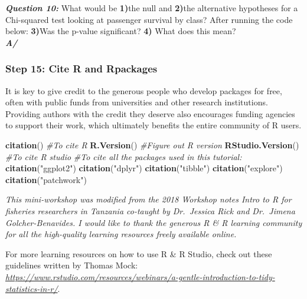 \documentclass[]{article}
\newenvironment{Shaded}{\begin{snugshade}}{\end{snugshade}}
\newcommand{\CommentTok}[1]{\textcolor[rgb]{0.56,0.35,0.01}{\textit{#1}}}
\newcommand{\KeywordTok}[1]{\textcolor[rgb]{0.13,0.29,0.53}{\textbf{#1}}}
\newcommand{\NormalTok}[1]{#1}
\newcommand{\OperatorTok}[1]{\textcolor[rgb]{0.81,0.36,0.00}{\textbf{#1}}}
\newcommand{\StringTok}[1]{\textcolor[rgb]{0.31,0.60,0.02}{#1}}
\begin{document}
\textbf{\emph{Question 10:}} What would be \textbf{1)}the null and
\textbf{2)}the alternative hypotheses for a Chi-squared test looking at
passenger survival by class? After running the code below:
\textbf{3)}Was the p-value significant? \textbf{4)} What does this
mean?\\
\textbf{\emph{A/}}

\begin{Shaded}
\end{Shaded}

\hypertarget{step-15-cite-r-and-rpackages}{%
\subsubsection{Step 15: Cite R and
Rpackages}\label{step-15-cite-r-and-rpackages}}

It is key to give credit to the generous people who develop packages for
free, often with public funds from universities and other research
institutions. Providing authors with the credit they deserve also
encourages funding agencies to support their work, which ultimately
benefits the entire community of R users.

\begin{Shaded}
\begin{Highlighting}[]
\KeywordTok{citation}\NormalTok{() }\CommentTok{#To cite R}
\KeywordTok{R.Version}\NormalTok{() }\CommentTok{#Figure out R version}
\KeywordTok{RStudio.Version}\NormalTok{() }\CommentTok{#To cite R studio}
\CommentTok{#To cite all the packages  used in this tutorial:}
\KeywordTok{citation}\NormalTok{(}\StringTok{"ggplot2"}\NormalTok{)}
\KeywordTok{citation}\NormalTok{(}\StringTok{"dplyr"}\NormalTok{)}
\KeywordTok{citation}\NormalTok{(}\StringTok{"tibble"}\NormalTok{)}
\KeywordTok{citation}\NormalTok{(}\StringTok{"explore"}\NormalTok{)}
\KeywordTok{citation}\NormalTok{(}\StringTok{"patchwork"}\NormalTok{)}
\end{Highlighting}
\end{Shaded}

\emph{This mini-workshop was modified from the 2018 Workshop notes Intro
to R for fisheries researchers in Tanzania co-taught by Dr.~Jessica Rick
and Dr.~Jimena Golcher-Benavides. I would like to thank the generous R
\& R learning community for all the high-quality learning resources
freely available online.}

For more learning resources on how to use R \& R Studio, check out these
guidelines written by Thomas Mock:
\emph{\url{https://www.rstudio.com/resources/webinars/a-gentle-introduction-to-tidy-statistics-in-r/}}.
\end{document}
